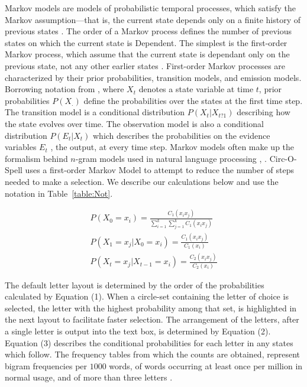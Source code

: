 \documentclass[12pt,titlepage]{article}
\begin{document}
Markov models are models of probabilistic temporal processes, which satisfy the Markov assumption---that
is, the current state depends only on a finite history of previous states \cite{russell_artificial_2002}.  The order of a Markov 
process defines the number of previous states on which the current state is Dependent.  The simplest is 
the first-order Markov process, which assume that the current state is dependant only on the previous 
state, not any other earlier states \cite{russell_artificial_2002}.  First-order Markov processes are characterized by their prior
probabilities, transition models, and emission models.  Borrowing notation from \cite{russell_artificial_2002}, where $X_t$  denotes
a state variable at time $t$, prior probabilities $P(X_.)$ define the probabilities over the states at the first 
time step.  The transition model is a conditional distribution $P(X_t | X_{t?1})$  describing how the state 
evolves over time.  The observation model is also a conditional distribution $P(E_t | X_t)$ which describes 
the probabilities on the evidence variables $E_t$ , the output, at every time step.  Markov models often 
make up the formalism behind $n$-gram models used in natural language processing \cite{brown_class-based_1992}, \cite{makhoul_state_1995}. 
Circ-O-Spell uses a first-order Markov Model to attempt to reduce the number of steps needed to make 
a selection.  We describe our calculations below and use the notation in Table~\ref{table:Not}.

\begin{gather*}
P(X_0 = x_i) = \frac{\displaystyle C_1(x_i x_j)}{\displaystyle \sum_{i=1}^k \sum_{j=1}^k C_1(x_i x_j)} \tag{1} \\
P(X_1 = x_j | X_0 = x_i) = \frac{\displaystyle C_1(x_i x_j)}{\displaystyle C_1(x_i)} \tag{2} \\
P(X_t = x_j | X_{t-1} = x_i) = \frac{\displaystyle C_2(x_i x_j)}{\displaystyle C_2(x_i)} \tag{3}
\end{gather*}

The default letter layout is determined by the order of the probabilities calculated by Equation (1). 
When a circle-set containing the letter of choice is selected, the letter with the highest probability 
among that set, is highlighted in the next layout to facilitate faster selection.  The arrangement of the letters, after a single 
letter is output into the text box, is determined by Equation (2).  Equation (3) describes the conditional 
probabilities for each letter in any states which follow.  The frequency tables from which the counts are obtained, represent bigram frequencies per $1000$ 
words, of words occurring at least once per million in normal usage, and of more than three letters \cite{rawlinson_bigram_1976}.
\end{document}
